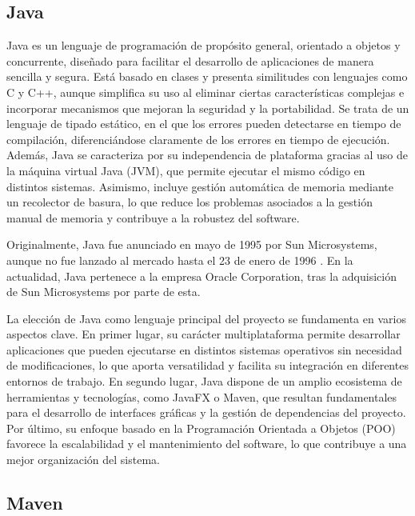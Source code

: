 \documentclass[../../main.tex]{subfiles}
\begin{document}
\subsection{Java}

\par{Java es un lenguaje de programación de propósito general, orientado a objetos y concurrente, diseñado para facilitar el desarrollo de aplicaciones de manera sencilla y segura. Está basado en clases y presenta similitudes con lenguajes como C y C++, aunque simplifica su uso al eliminar ciertas características complejas e incorporar mecanismos que mejoran la seguridad y la portabilidad. Se trata de un lenguaje de tipado estático, en el que los errores pueden detectarse en tiempo de compilación, diferenciándose claramente de los errores en tiempo de ejecución. Además, Java se caracteriza por su independencia de plataforma gracias al uso de la máquina virtual Java (JVM), que permite ejecutar el mismo código en distintos sistemas. Asimismo, incluye gestión automática de memoria mediante un recolector de basura, lo que reduce los problemas asociados a la gestión manual de memoria y contribuye a la robustez del software.\cite{gosling_java_lang_spec}}

\par{Originalmente, Java fue anunciado en mayo de 1995 por Sun Microsystems, aunque no fue lanzado al mercado hasta el 23 de enero de 1996 \cite{sun_microsystems_announcement}. En la actualidad, Java pertenece a la empresa Oracle Corporation, tras la adquisición de Sun Microsystems por parte de esta.}

\par{La elección de Java como lenguaje principal del proyecto se fundamenta en varios aspectos clave. En primer lugar, su carácter multiplataforma permite desarrollar aplicaciones que pueden ejecutarse en distintos sistemas operativos sin necesidad de modificaciones, lo que aporta versatilidad y facilita su integración en diferentes entornos de trabajo. En segundo lugar, Java dispone de un amplio ecosistema de herramientas y tecnologías, como JavaFX o Maven, que resultan fundamentales para el desarrollo de interfaces gráficas y la gestión de dependencias del proyecto. Por último, su enfoque basado en la Programación Orientada a Objetos (POO) favorece la escalabilidad y el mantenimiento del software, lo que contribuye a una mejor organización del sistema.}

\clearpage

\subsection{Maven}
\end{document}
